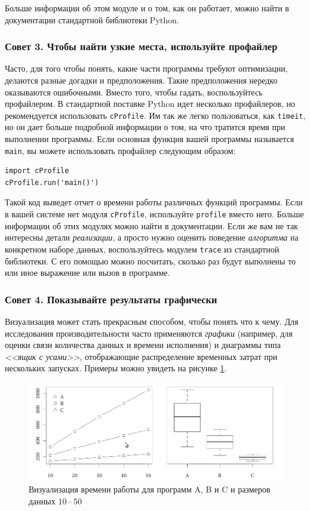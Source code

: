 Больше информации об этом модуле и о том, как он работает, можно найти в документации стандартной библиотеки Python.

\subsubsection*{Совет 3. Чтобы найти узкие места, используйте профайлер}

Часто, для того чтобы понять, какие части программы требуют оптимизации, делаются разные догадки и предположения. Такие предположения нередко оказываются ошибочными. Вместо того, чтобы гадать, воспользуйтесь профайлером. В стандартной поставке Python идет несколько профайлеров, но рекомендуется использовать \texttt{cProfile}. Им так же легко пользоваться, как \texttt{timeit}, но он дает больше подробной информации о том, на что тратится время при выполнении программы. Если основная функция вашей программы называется \texttt{main}, вы можете использовать профайлер следующим образом:

\begin{lstlisting}
import cProfile
cProfile.run('main()')
\end{lstlisting}

Такой код выведет отчет о времени работы различных функций программы. Если в вашей системе нет модуля \texttt{cProfile}, используйте \texttt{profile} вместо него. Больше информации об этих модулях можно найти в документации. Если же вам не так интересны детали \textit{реализации}, а просто нужно оценить поведение \textit{алгоритма} на конкретном наборе данных, воспользуйтесь модулем \texttt{trace} из стандартной библиотеки. С его помощью можно посчитать, сколько раз будут выполнены то или иное выражение или вызов в программе.

\subsubsection*{Совет 4. Показывайте результаты графически}

Визуализация может стать прекрасным способом, чтобы понять что к чему. Для исследования производительности часто применяются \textit{графики} (например, для оценки связи количества данных и времени исполнения) и диаграммы типа \textit{<<ящик с усами>>}, отображающие распределение временных затрат при нескольких запусках. Примеры можно увидеть на рисунке \ref{fig:evaluation-diagrams}.

\begin{figure}[h]
	\centering
	\includegraphics[width=\textwidth]{img/2-2.png}
	\caption{Визуализация времени работы для программ A, B и C и размеров данных 10\,--\,50}
	\label{fig:evaluation-diagrams}
\end{figure}

